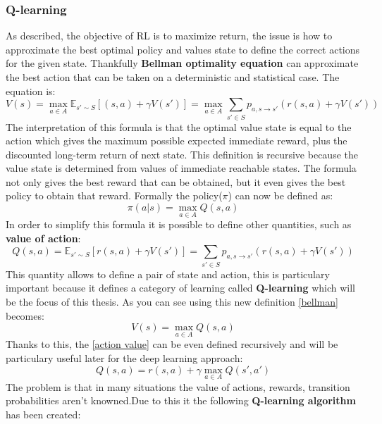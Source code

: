 \subsubsection{Q-learning}
As described, the objective of RL is to maximize return, the issue is how to approximate the best optimal policy and values state to define the correct actions for the given state. Thankfully \textbf{Bellman optimality equation} can approximate the best action that can be taken on a deterministic and statistical case. The equation is:
\begin{equation}\label{bellman}
	V(s) = \max_{a \in A} \mathbb{E}_{s' \sim S}[(s,a) + \gamma V(s')] = \max_{a \in A} \sum_{s' \in S} p_{a, s \to s'}(r(s,a) + \gamma V(s'))
\end{equation}
The interpretation of this formula is that the optimal value state is equal to the action which gives the maximum possible expected immediate reward, plus the discounted long-term return of next state. This definition is recursive because the value state is determined from values of immediate reachable states. The formula not only gives the best reward that can be obtained, but it even gives the best policy to obtain that reward.
Formally the policy($\pi$) can now be defined as:
\begin{equation}\label{policy q learning}
	\pi(a | s) = \max_{a \in A} Q(s,a)
\end{equation}
In order to simplify this formula it is possible to define other quantities, such as \textbf{value of action}:
\begin{equation}\label{action value}
	Q(s,a) = \mathbb{E}_{s' \sim S}[r(s,a)+ \gamma V(s')] = \sum_{s' \in S} p_{a, s \to s'}(r(s,a) + \gamma V(s'))
\end{equation}
This quantity allows to define a pair of state and action, this is particulary important because it defines a category of learning called \textbf{Q-learning} which will be the focus of this thesis. As you can see using this new definition \ref{bellman} becomes:
\begin{equation*}
	V(s) = \max_{a \in A} Q(s,a)
\end{equation*}
Thanks to this, the \ref{action value} can be even defined recursively and will be particulary useful later for the deep learning approach:
\begin{equation}\label{recursive}
	Q(s,a) = r(s,a) + \gamma \max_{a \in A} Q(s',a')
\end{equation} 
The problem is that in many situations the value of actions, rewards, transition probabilities aren't knowned.Due to this it the following \textbf{Q-learning algorithm} has been created:
